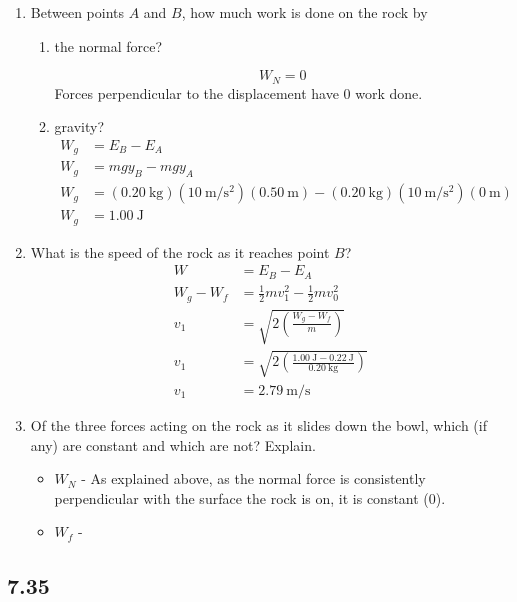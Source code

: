\documentclass{article}
\begin{document}
\begin{enumerate}[label = \textbf{(\alph*)}]
	\item Between points $ A $ and $ B $, how much work is done on the rock by
		\begin{enumerate}[label = \textbf{(\roman*)}]
			\item the normal force?
				\begin{mdframed}
					$$ W_N = 0 $$
					Forces perpendicular to the displacement have 0 work done.
				\end{mdframed}
			\item gravity?
				\begin{align*}
					W_g & = E_B - E_A \\
					W_g & = mgy_B - mgy_A \\
					W_g & = (\SI{0.20}{\kilogram})(\SI{10}{\meter \per \second \squared})(\SI{0.50}{\meter}) - (\SI{0.20}{\kilogram})(\SI{10}{\meter \per \second \squared})(\SI{0}{\meter}) \\
					W_g & = \SI{1.00}{\joule}
				\end{align*}
		\end{enumerate}
	\item What is the speed of the rock as it reaches point $ B $?
		\begin{align*}
			W & = E_B - E_A \\
			W_g - W_f & = \frac{1}{2}mv_1^2 - \frac{1}{2}mv_0^2 \\
			v_1 & = \sqrt{ 2 \left( \frac{W_g - W_f}{m} \right) } \\
			v_1 & = \sqrt{ 2 \left( \frac{\SI{1.00}{\joule} - \SI{0.22}{\joule}}{\SI{0.20}{\kilogram}} \right) } \\
			v_1 & = \SI{2.79}{\meter \per \second}
		\end{align*}
	\item Of the three forces acting on the rock as it slides down the bowl, which (if any) are constant and which are not? Explain.
		\begin{itemize}
			\item $ W_N $ - As explained above, as the normal force is consistently perpendicular with the surface the rock is on, it is constant (0).
			\item $ W_f $ - 
		\end{itemize}
\end{enumerate}

\subsection{7.35}
\end{document}

